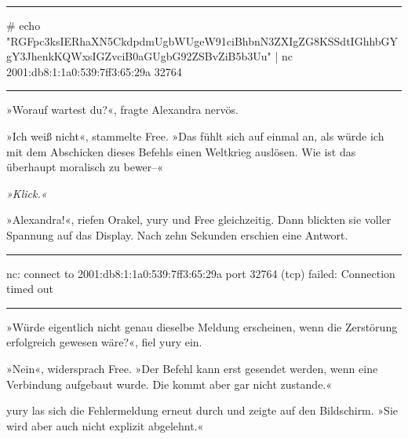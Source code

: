\noindent \parbox{\textwidth}{ \vspace{3ex} \hrule \vspace{3ex}

    \begin{tiny}
    \begin{ttfamily}

\noindent \# echo "RGFpc3ksIERhaXN5CkdpdmUgbWUgeW91ciBhbnN3ZXIgZG8KSSdtIGhhbGYgY3JhenkKQWxsIGZvciB0aGUgbG92ZSBvZiB5b3Uu" | nc 2001:db8:1:1a0:539:7ff3:65:29a 32764

    \end{ttfamily}
    \end{tiny}

\vspace{3ex} \hrule \vspace{3ex} }

»Worauf wartest du?«, fragte Alexandra nervös.

»Ich weiß nicht«, stammelte Free. »Das fühlt sich auf einmal an, als würde ich mit dem Abschicken dieses Befehls einen Weltkrieg auslösen. Wie ist das überhaupt moralisch zu bewer–«

\textit{»Klick.«}

»Alexandra!«, riefen Orakel, yury und Free gleichzeitig. Dann blickten sie voller Spannung auf das Display. Nach zehn Sekunden erschien eine Antwort.

\noindent \parbox{\textwidth}{ \vspace{3ex} \hrule \vspace{3ex}

    \begin{tiny}
    \begin{ttfamily}

\noindent nc: connect to 2001:db8:1:1a0:539:7ff3:65:29a port 32764 (tcp) failed: Connection timed out

    \end{ttfamily}
    \end{tiny}

\vspace{3ex} \hrule \vspace{3ex} }

»Würde eigentlich nicht genau dieselbe Meldung erscheinen, wenn die Zerstörung erfolgreich gewesen wäre?«, fiel yury ein.

»Nein«, widersprach Free. »Der Befehl kann erst gesendet werden, wenn eine Verbindung aufgebaut wurde. Die kommt aber gar nicht zustande.«

yury las sich die Fehlermeldung erneut durch und zeigte auf den Bildschirm. »Sie wird aber auch nicht explizit abgelehnt.«

